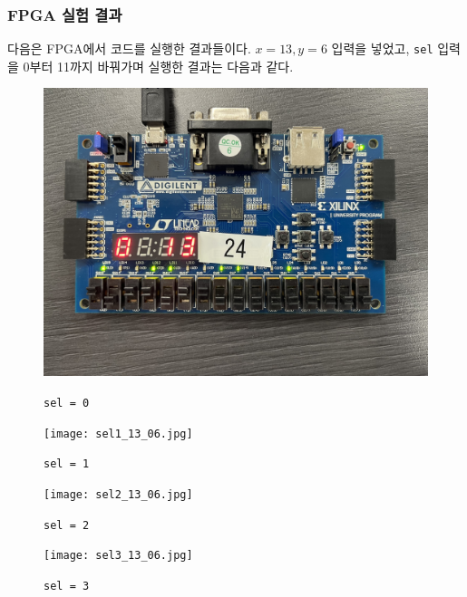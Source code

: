\documentclass{scrartcl}
\begin{document}
\subsubsection{FPGA 실험 결과}
다음은 FPGA에서 코드를 실행한 결과들이다.
\(x = 13, y = 6\) 입력을 넣었고, \texttt{sel} 입력을 0부터 11까지 바꿔가며 실행한 결과는 다음과 같다.
\begin{figure}[H]
  \centering
  \begin{minipage}{0.45\linewidth}
    \centering
    \includegraphics[width=1\linewidth]{sel0_13_06.jpg}
    \caption{\texttt{sel = 0}}
  \end{minipage}\quad
  \begin{minipage}{0.45\linewidth}
    \centering
    \texttt{[image: sel1\_13\_06.jpg]}
    \caption{\texttt{sel = 1}}
  \end{minipage}
\end{figure}
\begin{figure}[H]
  \centering
  \begin{minipage}{0.45\linewidth}
    \centering
    \texttt{[image: sel2\_13\_06.jpg]}
    \caption{\texttt{sel = 2}}
  \end{minipage}\quad
  \begin{minipage}{0.45\linewidth}
    \centering
    \texttt{[image: sel3\_13\_06.jpg]}
    \caption{\texttt{sel = 3}}
  \end{minipage}
\end{figure}
\end{document}
